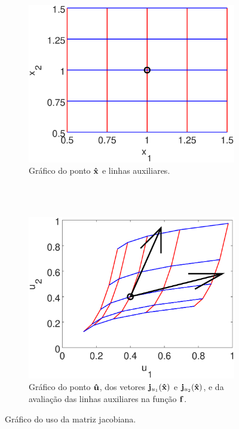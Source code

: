 \begin{figure}[!h]
    \centering
    \begin{subfigure}[b]{0.49\textwidth}
        \includegraphics[width=\textwidth]{chapters/derivada/mfiles/jacobian/jacobian1.eps}
        \caption{Gráfico do ponto $\VECTOR{\hat{x}}$ e linhas auxiliares. ~~~~~~~~~ ~~~~~~~~~ ~~~~~~~~~}
        \label{fig:ex:jacobiano:x}
    \end{subfigure}
    ~ %
    \begin{subfigure}[b]{0.49\textwidth}
        \includegraphics[width=\textwidth]{chapters/derivada/mfiles/jacobian/jacobian2.eps}
        \caption{Gráfico do ponto $\VECTOR{\hat{u}}$, dos vetores $\VECTOR{j}_{u_1}(\VECTOR{\hat{x}})$ e
    $\VECTOR{j}_{u_2}(\VECTOR{\hat{x}})$, e da avaliação das linhas auxiliares na função $\VECTOR{f}$.}
        \label{fig:ex:jacobiano:u}
    \end{subfigure}
    \caption{Gráfico do uso da matriz jacobiana.}
    \label{fig:ex:jacobiano}
\end{figure}


